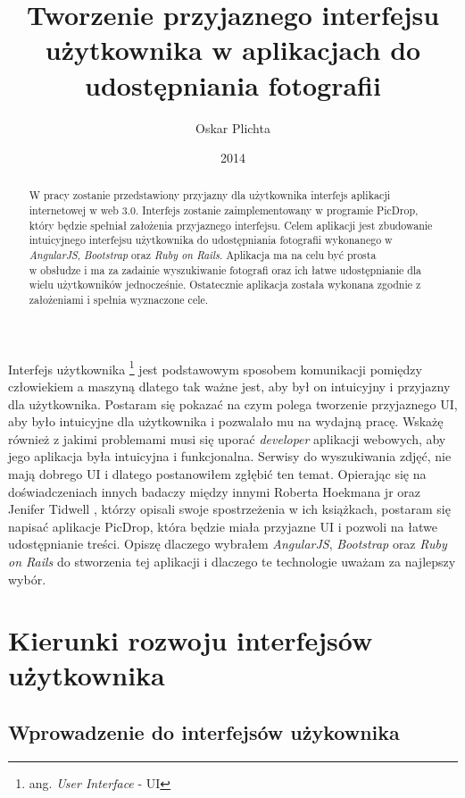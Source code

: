 \documentclass[brudnopis]{xmgr}
\author   {Oskar Plichta}
\title    {Tworzenie przyjaznego interfejsu użytkownika w aplikacjach do udostępniania fotografii }
\date     {2014}
\begin{document}
\begin{abstract}

W pracy zostanie przedstawiony przyjazny dla użytkownika interfejs aplikacji internetowej w web 3.0. Interfejs zostanie zaimplementowany w programie PicDrop,  który będzie spełniał założenia przyjaznego interfejsu. Celem aplikacji jest zbudowanie intuicyjnego interfejsu użytkownika do udostępniania fotografii wykonanego w \textit{AngularJS}, \textit{Bootstrap} oraz \textit{Ruby on Rails}. Aplikacja ma na celu być prosta \\ w obsłudze i ma za zadainie wyszukiwanie fotografi oraz ich łatwe udostępnianie dla wielu użytkowników jednocześnie. Ostatecznie aplikacja została wykonana zgodnie z założeniami i spełnia wyznaczone cele.

\end{abstract}

\maketitle
%
\introduction
Interfejs użytkownika \footnote{ang. \textit{User Interface} - UI}  jest podstawowym sposobem komunikacji pomiędzy człowiekiem a maszyną dlatego tak ważne jest, aby był on intuicyjny i przyjazny dla użytkownika. 
Postaram się pokazać na czym polega tworzenie przyjaznego UI, aby było intuicyjne dla użytkownika i pozwalało mu na wydajną pracę. Wskażę również z jakimi problemami musi się uporać \textit{developer} aplikacji webowych, aby jego aplikacja była intuicyjna i funkcjonalna. Serwisy do wyszukiwania zdjęć, nie mają dobrego UI i dlatego postanowiłem zgłębić ten temat. Opierając się na  doświadczeniach innych badaczy  między innymi Roberta Hoekmana jr  \cite {magiaUI} oraz Jenifer Tidwell  \cite {projektowanieUI}, którzy opisali swoje spostrzeżenia w ich książkach, postaram się napisać aplikacje PicDrop, która  będzie miała przyjazne UI i pozwoli na łatwe udostępnianie treści. Opiszę dlaczego wybrałem \textit{AngularJS}, \textit{Bootstrap} oraz \textit{Ruby on Rails} do stworzenia tej aplikacji i dlaczego te technologie uważam za najlepszy wybór.


\chapter{Kierunki rozwoju interfejsów użytkownika}

\section{Wprowadzenie do interfejsów użykownika}
\end{document}
